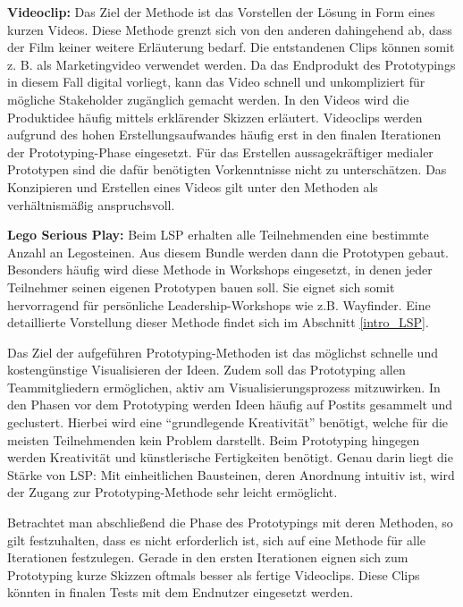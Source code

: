 \textbf{Videoclip:} Das Ziel der Methode ist das Vorstellen der Lösung in Form eines kurzen Videos. Diese Methode grenzt sich von den anderen dahingehend ab, dass der Film keiner weitere Erläuterung bedarf. Die entstandenen Clips können somit z. B. als Marketingvideo verwendet werden. Da das Endprodukt des Prototypings in diesem Fall digital vorliegt, kann das Video schnell und unkompliziert für mögliche Stakeholder zugänglich gemacht werden. In den Videos wird die Produktidee häufig mittels erklärender Skizzen erläutert. Videoclips werden aufgrund des hohen Erstellungsaufwandes häufig erst in den finalen Iterationen der Prototyping-Phase eingesetzt. Für das Erstellen aussagekräftiger medialer Prototypen sind die dafür benötigten Vorkenntnisse nicht zu unterschätzen. Das Konzipieren und Erstellen eines Videos gilt unter den Methoden als verhältnismäßig anspruchsvoll. 

\textbf{Lego Serious Play: } Beim LSP erhalten alle Teilnehmenden eine bestimmte Anzahl an Legosteinen. Aus diesem Bundle werden dann die Prototypen gebaut. Besonders häufig wird diese Methode in Workshops eingesetzt, in denen jeder Teilnehmer seinen eigenen Prototypen bauen soll. Sie eignet sich somit hervorragend für persönliche Leadership-Workshops wie z.B. Wayfinder. Eine detaillierte Vorstellung dieser Methode findet sich im Abschnitt \ref{intro_LSP}. \newline

Das Ziel der aufgeführen Prototyping-Methoden ist das möglichst schnelle und kostengünstige Visualisieren der Ideen. Zudem soll das Prototyping allen Teammitgliedern ermöglichen, aktiv am Visualisierungsprozess mitzuwirken. In den Phasen vor dem Prototyping werden Ideen häufig auf Postits gesammelt und geclustert. Hierbei wird eine ``grundlegende Kreativität'' benötigt, welche für die meisten Teilnehmenden kein Problem darstellt. Beim Prototyping hingegen werden Kreativität und künstlerische Fertigkeiten benötigt. Genau darin liegt die Stärke von LSP: Mit einheitlichen Bausteinen, deren Anordnung intuitiv ist, wird der Zugang zur Prototyping-Methode sehr leicht ermöglicht.

Betrachtet man abschließend die Phase des Prototypings mit deren Methoden, so gilt festzuhalten, dass es nicht erforderlich ist, sich auf eine Methode für alle Iterationen festzulegen. Gerade in den ersten Iterationen eignen sich zum Prototyping kurze Skizzen oftmals besser als fertige Videoclips. Diese Clips könnten in finalen Tests mit dem Endnutzer eingesetzt werden.


